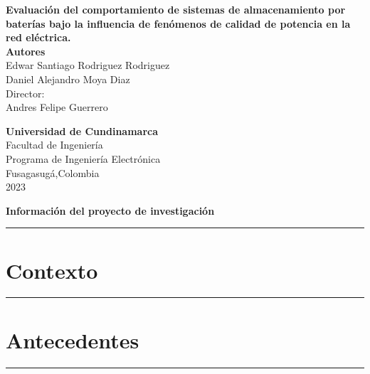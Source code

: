\documentclass[12pt,twoside]{article}
\date{}
\begin{document}
\begin{titlepage}
\begin{center}


{\Large \textbf{Evaluación del comportamiento de sistemas de almacenamiento por baterías bajo la influencia de fenómenos de calidad de potencia en la red eléctrica.}}\\%
\vspace*{2\baselineskip}
\textbf{Autores}\\
\vspace*{0.2\baselineskip}
Edwar Santiago Rodriguez Rodriguez \\[0.2cm]
Daniel Alejandro Moya Diaz\\[0.2cm]

\vspace*{3.5\baselineskip}
Director:\\
Andres Felipe Guerrero\\
\vspace*{2\baselineskip}


\vfill %
\textbf{Universidad de Cundinamarca} \\
Facultad de Ingeniería\\
Programa de Ingeniería Electrónica\\
Fusagasug\'{a},Colombia\\
2023

\end{center}
\end{titlepage}
\newpage
\begin{center}
{\LARGE \textbf{Información del proyecto de investigación }}
\end{center}
\vspace*{0.09\baselineskip}
\hrule
\vspace*{0.2\baselineskip}

\newpage
\section{Contexto}
\vspace*{0.08\baselineskip}
\hrule
\vspace*{0.2\baselineskip}


\newpage
\section{Antecedentes}
\vspace*{0.08\baselineskip}
\hrule
\vspace*{0.7\baselineskip}

\end{document}
